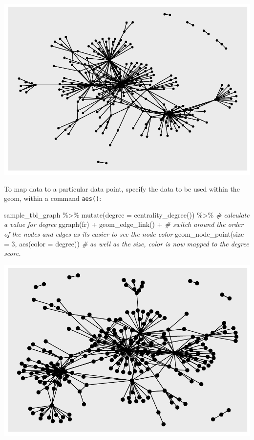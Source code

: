 \documentclass[
]{book}
\newenvironment{Shaded}{\begin{snugshade}}{\end{snugshade}}
\newcommand{\AttributeTok}[1]{\textcolor[rgb]{0.77,0.63,0.00}{#1}}
\newcommand{\CommentTok}[1]{\textcolor[rgb]{0.56,0.35,0.01}{\textit{#1}}}
\newcommand{\DecValTok}[1]{\textcolor[rgb]{0.00,0.00,0.81}{#1}}
\newcommand{\FunctionTok}[1]{\textcolor[rgb]{0.00,0.00,0.00}{#1}}
\newcommand{\NormalTok}[1]{#1}
\newcommand{\SpecialCharTok}[1]{\textcolor[rgb]{0.00,0.00,0.00}{#1}}
\newcommand{\StringTok}[1]{\textcolor[rgb]{0.31,0.60,0.02}{#1}}
\begin{document}
\includegraphics{_main_files/figure-latex/unnamed-chunk-59-1.pdf}

To map data to a particular data point, specify the data to be used within the geom, within a command \texttt{aes()}:

\begin{Shaded}
\begin{Highlighting}[]
\NormalTok{sample\_tbl\_graph }\SpecialCharTok{\%\textgreater{}\%} 
  \FunctionTok{mutate}\NormalTok{(}\AttributeTok{degree =} \FunctionTok{centrality\_degree}\NormalTok{()) }\SpecialCharTok{\%\textgreater{}\%} \CommentTok{\# calculate a value for degree}
  \FunctionTok{ggraph}\NormalTok{(}\StringTok{\textquotesingle{}fr\textquotesingle{}}\NormalTok{) }\SpecialCharTok{+} 
  \FunctionTok{geom\_edge\_link}\NormalTok{() }\SpecialCharTok{+} \CommentTok{\# switch around the order of the nodes and edges as it\textquotesingle{}s easier to see the node color}
  \FunctionTok{geom\_node\_point}\NormalTok{(}\AttributeTok{size =} \DecValTok{3}\NormalTok{, }\FunctionTok{aes}\NormalTok{(}\AttributeTok{color =}\NormalTok{ degree)) }\CommentTok{\# as well as the size, color is now mapped to the degree score.}
\end{Highlighting}
\end{Shaded}

\includegraphics{_main_files/figure-latex/unnamed-chunk-60-1.pdf}
\end{document}
